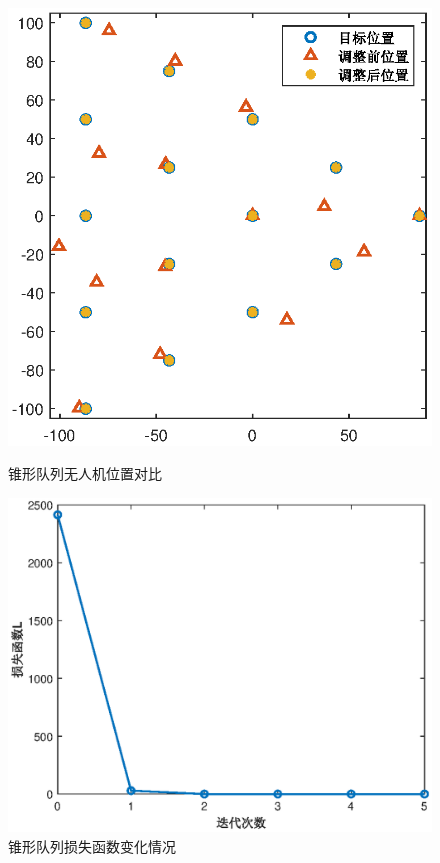 \documentclass[12pt,AutoFakeSlant,AutoFakeBold]{article}
\begin{document}
\begin{figure}[!ht]
    \centering
    \begin{minipage}[t]{0.43\textwidth}
        \centering
        \includegraphics[width=\textwidth]{图片/无人机位置对比_锥形.eps}
        \caption{锥形队列无人机位置对比}
        \label{fig:无人机位置对比_锥形}
    \end{minipage}
    \begin{minipage}[t]{0.56\textwidth}
        \centering
        \includegraphics[width=\textwidth]{图片/损失函数变化_锥形.eps}
        \caption{锥形队列损失函数变化情况}
        \label{fig:损失函数变化_锥形}
    \end{minipage}
\end{figure}
\end{document}

